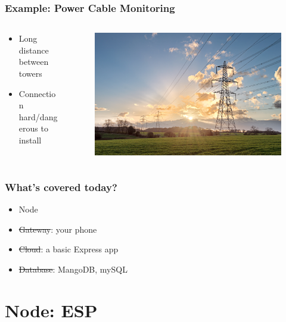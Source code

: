 \documentclass[compress, aspectratio=32]{beamer}
\begin{document}
\begin{frame}
    \frametitle{Example: Power Cable Monitoring}
    \begin{columns}
        \begin{column}{0.4\textwidth}
            \begin{itemize}
                \item Long distance between towers
                \item Connection hard/dangerous to install
            \end{itemize}
        \end{column}
        \begin{column}{0.6\textwidth}
            \begin{figure}
                \includegraphics[width=\textwidth]{AdobeStock_133386757.jpeg}
            \end{figure}
        \end{column}
    \end{columns}
\end{frame}

\begin{frame}
    \frametitle{What's covered today?}
    \begin{itemize}
        \item Node
        \item \st{Gateway}: your phone
        \item \st{Cloud}: a basic Express app
        \item \st{Database}: MangoDB, mySQL
    \end{itemize}
\end{frame}

\section{Node: ESP}
\end{document}

